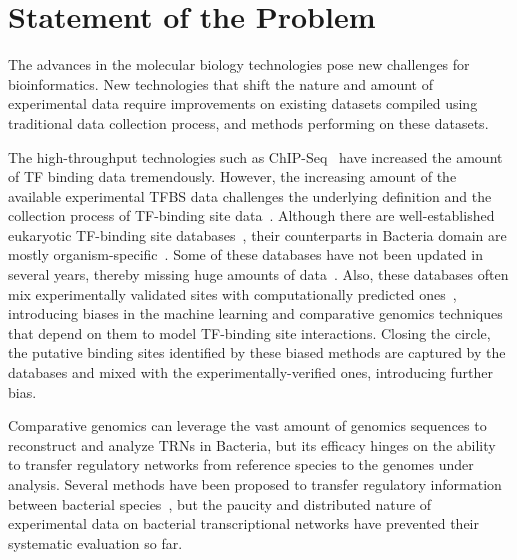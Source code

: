 \section{Statement of the Problem}

The advances in the molecular biology technologies pose new challenges for
bioinformatics. New technologies that shift the nature and amount of
experimental data require improvements on existing datasets compiled using
traditional data collection process, and methods performing on these datasets.

The high-throughput technologies such as ChIP-Seq~\citep{bailey2013practical}
have increased the amount of TF binding data tremendously. However, the
increasing amount of the available experimental TFBS data challenges the
underlying definition and the collection process of TF-binding site
data~\citep{salgado2013regulondb}. Although there are well-established
eukaryotic TF-binding site databases~\citep{mathelier2015jaspar,
  matys2003transfac}, their counterparts in Bacteria domain are mostly
organism-specific~\citep{salgado2013regulondb, sierro2008dbtbs,
  jacques2005mtbreglist, pauling2012coryneregnet}. Some of these databases have
not been updated in several years, thereby missing huge amounts of
data~\citep{munch2003prodoric}. Also, these databases often mix experimentally
validated sites with computationally predicted
ones~\citep{kazakov2007regtransbase}, introducing biases in the machine learning
and comparative genomics techniques that depend on them to model TF-binding
site interactions. Closing the circle, the putative binding sites identified by
these biased methods are captured by the databases and mixed with the
experimentally-verified ones, introducing further bias.

Comparative genomics can leverage the vast amount of genomics sequences to
reconstruct and analyze TRNs in Bacteria, but its efficacy hinges on the
ability to transfer regulatory networks from reference species to the genomes
under analysis. Several methods have been proposed to transfer regulatory
information between bacterial species~\citep{babu2009methods,
  baumbach2010power}, but the paucity and distributed nature of experimental
data on bacterial transcriptional networks have prevented their systematic
evaluation so far.

